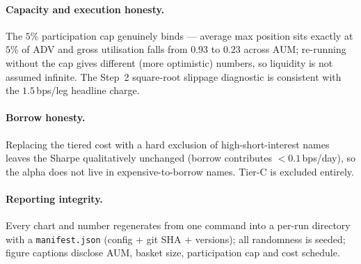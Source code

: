 \documentclass[11pt,a4paper]{article}
\newcommand{\code}[1]{\texttt{#1}}
\begin{document}
\paragraph{Capacity and execution honesty.} The $5\%$ participation cap genuinely binds --- average max
position sits exactly at $5\%$ of ADV and gross utilisation falls from $0.93$ to $0.23$ across AUM; re-running
without the cap gives different (more optimistic) numbers, so liquidity is not assumed infinite. The Step~2
square-root slippage diagnostic is consistent with the $1.5$\,bps/leg headline charge.

\paragraph{Borrow honesty.} Replacing the tiered cost with a hard exclusion of high-short-interest names leaves
the Sharpe qualitatively unchanged (borrow contributes $<0.1$\,bps/day), so the alpha does not live in
expensive-to-borrow names. Tier-C is excluded entirely.

\paragraph{Reporting integrity.} Every chart and number regenerates from one command into a per-run directory
with a \code{manifest.json} (config + git SHA + versions); all randomness is seeded; figure captions disclose
AUM, basket size, participation cap and cost schedule.

\end{document}
